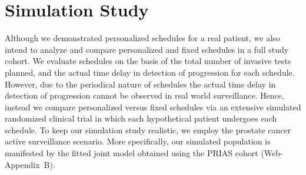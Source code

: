 \section{Simulation Study}
\label{sec:sim_study}
Although we demonstrated personalized schedules for a real patient, we also intend to analyze and compare personalized and fixed schedules in a full study cohort. We evaluate schedules on the basis of the total number of invasive tests planned, and the actual time delay in detection of progression for each schedule. However, due to the periodical nature of schedules the actual time delay in detection of progression cannot be observed in real world surveillance. Hence, instead we compare personalized versus fixed schedules via an extensive simulated randomized clinical trial in which each hypothetical patient undergoes each schedule. To keep our simulation study realistic, we employ the prostate cancer active surveillance scenario. More specifically, our simulated population is manifested by the fitted joint model obtained using the PRIAS cohort (Web-Appendix~B).

